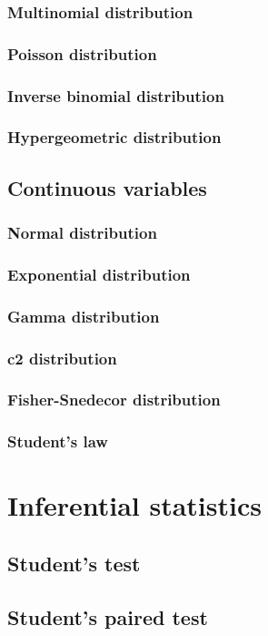 \documentclass{report}
\begin{document}
		\subsection{Multinomial distribution}
		\subsection{Poisson distribution}
		\subsection{Inverse binomial distribution}
		\subsection{Hypergeometric distribution}
	\section{Continuous variables}
		\subsection{Normal distribution}
		\subsection{Exponential distribution}
		\subsection{Gamma distribution}
		\subsection{c2 distribution}
		\subsection{Fisher-Snedecor distribution}
		\subsection{Student’s law}

\chapter{Inferential statistics}
	\section{Student’s test}
	\section{Student’s paired test}
\end{document}
